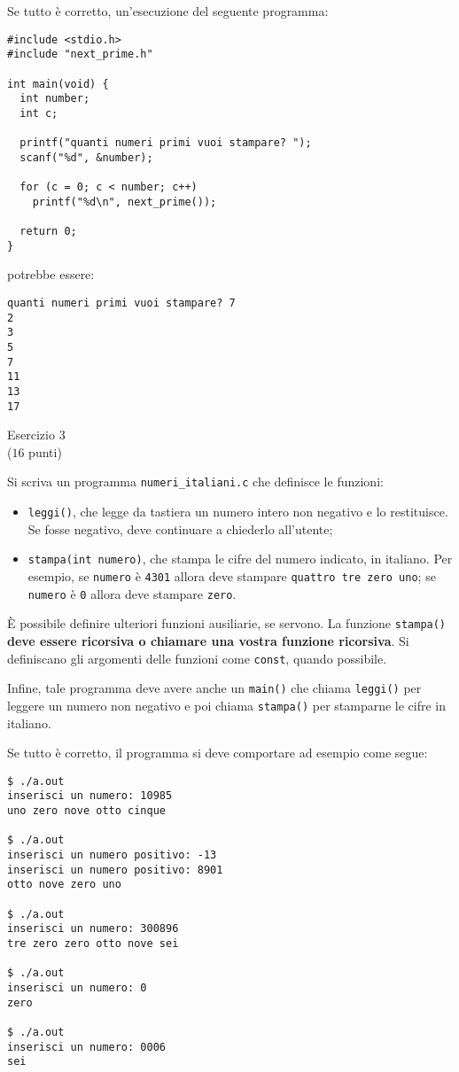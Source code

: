 \documentclass[italian,12pt]{article}
\begin{document}
Se tutto \`e corretto, un'esecuzione del seguente programma:
%
{\small
\begin{verbatim}
#include <stdio.h>
#include "next_prime.h"

int main(void) {
  int number;
  int c;

  printf("quanti numeri primi vuoi stampare? ");
  scanf("%d", &number);

  for (c = 0; c < number; c++)
    printf("%d\n", next_prime());

  return 0;
}
\end{verbatim}
}
%
\noindent
potrebbe essere:
%
{\small
\begin{verbatim}
quanti numeri primi vuoi stampare? 7
2
3
5
7
11
13
17
\end{verbatim}
}
%
\begin{center}{\Large Esercizio 3}\\
($16$ punti)\end{center}
%
Si scriva un programma \texttt{numeri\_italiani.c} che definisce le funzioni:
\begin{itemize}
\item \texttt{leggi()}, che legge da tastiera un numero intero non negativo e lo restituisce.
      Se fosse negativo, deve continuare a chiederlo all'utente;
\item \texttt{stampa(int numero)}, che stampa le cifre del numero indicato, in italiano. Per
      esempio, se \texttt{numero} \`e \texttt{4301} allora deve stampare \texttt{quattro tre zero uno};
      se \texttt{numero} \`e \texttt{0} allora deve stampare \texttt{zero}.
\end{itemize}
%
\`E possibile definire ulteriori funzioni ausiliarie, se servono. La funzione \texttt{stampa()}
\textbf{deve essere ricorsiva o chiamare una vostra funzione ricorsiva}.
Si definiscano gli argomenti delle funzioni come \texttt{const}, quando possibile.

Infine, tale programma deve avere anche un \texttt{main()} che chiama
\texttt{leggi()} per leggere un numero non negativo e poi chiama \texttt{stampa()}
per stamparne le cifre in italiano.

Se tutto \`e corretto, il programma si deve comportare ad esempio come segue:
%
{\small
\begin{verbatim}
$ ./a.out
inserisci un numero: 10985
uno zero nove otto cinque

$ ./a.out
inserisci un numero positivo: -13
inserisci un numero positivo: 8901
otto nove zero uno 

$ ./a.out
inserisci un numero: 300896
tre zero zero otto nove sei

$ ./a.out
inserisci un numero: 0
zero

$ ./a.out
inserisci un numero: 0006
sei
\end{verbatim}
}
\end{document}
